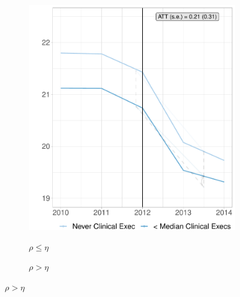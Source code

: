 \documentclass[12pt]{article}
\begin{document}
    \begin{figure}[ht!]
     \caption{Effect of Clinical Training on Readmission Rates, Binned Treatment}
     \centering
     \begin{subfigure}[b]{0.45\textwidth}
         \centering
         \caption{$\rho \leq \eta$}
         \includegraphics[width=\textwidth]{Objects/cont_belowmedread_md_nomd_synth_graph.pdf}
         \label{fig:belowmed_read_synth_clinical}
     \end{subfigure}
     \hfill
     \begin{subfigure}[b]{0.45\textwidth}
         \centering
         \caption{$\rho > \eta$}

\end{subfigure}
\end{figure}
\end{document}
